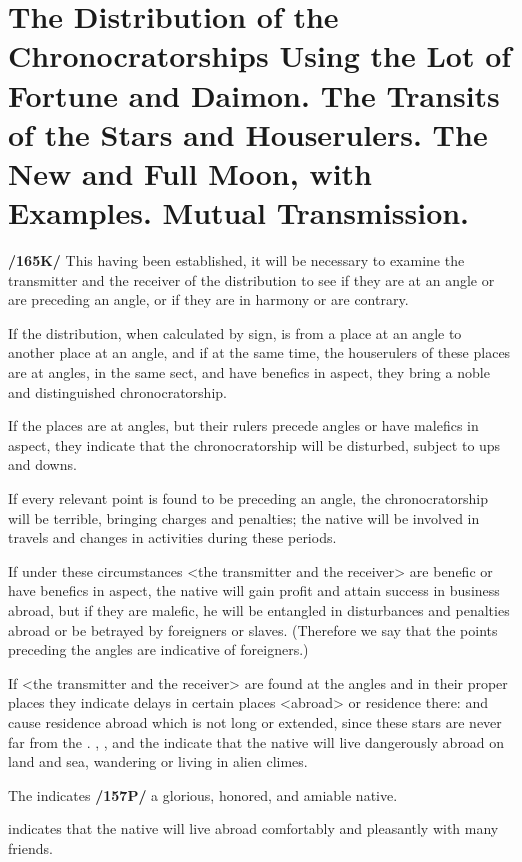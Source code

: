 \section{The Distribution of the Chronocratorships Using the Lot of Fortune and Daimon. The Transits of the Stars and Houserulers. The New and Full Moon, with Examples. Mutual Transmission.}

\textbf{/165K/} This having been established, it will be necessary to examine the transmitter and the receiver of the
distribution to see if they are at an angle or are preceding an angle, or if they are in harmony or are contrary.

If the distribution, when calculated by sign, is from a place at an angle to another place at an angle, and if at the same time, the houserulers of these places are at angles, in the same sect, and have benefics in aspect, they bring a noble and distinguished chronocratorship. 

If the places are at angles, but their rulers precede angles or have malefics in aspect, they indicate that the chronocratorship will be disturbed, subject to ups and downs.

If every relevant point is found to be preceding an angle, the chronocratorship will be terrible, bringing charges and penalties; the native will be involved in travels and changes in activities during these periods.

If under these circumstances <the transmitter and the receiver> are benefic or have benefics in aspect, the native will gain profit and attain success in business abroad, but if they are malefic, he will be entangled in disturbances and penalties abroad or be betrayed by foreigners or slaves. (Therefore we say that the points preceding the angles are indicative of foreigners.) 

If <the transmitter and the receiver> are found at the angles and in their proper places they indicate delays in certain places <abroad> or residence there: \Mercury\xspace and \Venus\xspace cause residence abroad which is not long or extended, since these stars are never far from the \Sun. \Saturn, \Mars, and the \Moon\xspace indicate that the native will live dangerously abroad on land and sea, wandering or living in alien climes. 

The \Sun\xspace indicates \textbf{/157P/} a glorious, honored, and amiable native. 

\Jupiter\xspace indicates that the native will live abroad comfortably and pleasantly with many friends.


